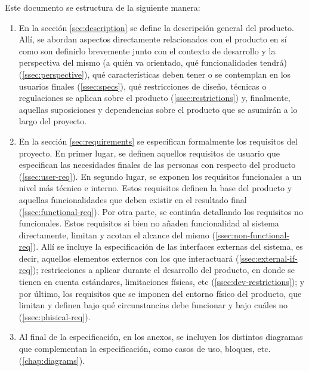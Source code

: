 Este documento se estructura de la siguiente manera:

\begin{enumerate}
  \item En la sección \ref{sec:description} se define la descripción general del
        producto. Allí, se abordan aspectos directamente relacionados con el producto en sí
        como son definirlo brevemente junto con el contexto de desarrollo y
        la perspectiva del mismo (a quién va orientado, qué funcionalidades tendrá)
        (\ref{ssec:perspective}), qué características deben tener o se contemplan en
        los usuarios finales (\ref{ssec:specs}), qué restricciones de diseño, técnicas
        o regulaciones se aplican sobre el producto (\ref{ssec:restrictions}) y,
        finalmente, aquellas suposiciones y dependencias sobre el producto que se
        asumirán a lo largo del proyecto.
  \item En la sección \ref{sec:requirements} se especifican formalmente los
        requisitos del proyecto. En primer lugar, se definen aquellos requisitos
        de usuario que especifican las necesidades finales de las personas con respecto
        del producto (\ref{ssec:user-req}). En segundo lugar, se exponen los requisitos
        funcionales a un nivel más técnico e interno. Estos requisitos definen la
        base del producto y aquellas funcionalidades que deben existir en el resultado
        final (\ref{ssec:functional-req}). Por otra parte, se continúa detallando
        los requisitos no funcionales. Estos requisitos si bien no añaden funcionalidad
        al sistema directamente, limitan y acotan el alcance del mismo (\ref{ssec:non-functional-req}).
        Allí se incluye la especificación de las interfaces externas
        del sistema, es decir, aquellos elementos externos con los que interactuará
        (\ref{ssec:external-if-req}); restricciones a aplicar durante el desarrollo del
        producto, en donde se tienen en cuenta estándares, limitaciones físicas, etc
        (\ref{ssec:dev-restrictions}); y por último, los requisitos que se imponen del
        entorno físico del producto, que limitan y definen bajo qué circunstancias
        debe funcionar y bajo cuáles no (\ref{ssec:phisical-req}).
  \item Al final de la especificación, en los anexos, se incluyen los distintos diagramas
        que complementan la especificación, como casos de uso, bloques, etc. (\ref{chap:diagrams}).
\end{enumerate}